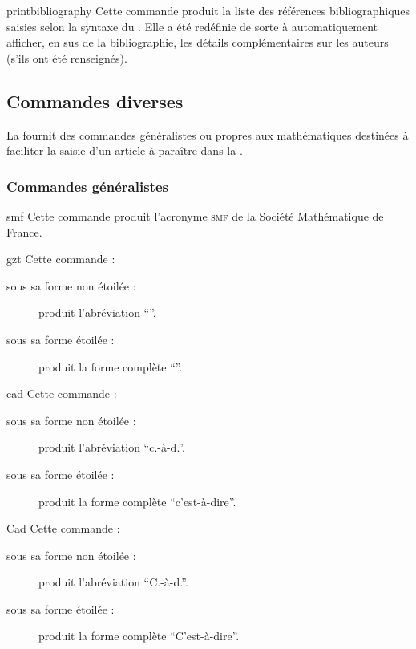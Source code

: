 \begin{docCommand}{printbibliography}{}
  Cette commande produit la liste des références bibliographiques saisies selon
  la syntaxe du . Elle a été redéfinie de sorte
  à automatiquement afficher, en sus de la bibliographie, les détails
  complémentaires sur les auteurs (s'ils ont été renseignés).
\end{docCommand}

\subsection{Commandes diverses}
\label{sec:commandes-diverses}

La \gztauthorcl{} fournit des commandes généralistes ou propres aux
mathématiques destinées à faciliter la saisie d'un article à paraître dans la
\gzt{}.

\subsubsection{Commandes généralistes}
\label{sec:comm-gener}

\begin{docCommand}{smf}{}
  Cette commande produit l'acronyme \textsc{smf} de la Société Mathématique de
  France.
\end{docCommand}

\begin{docCommand}{gzt}{}
  Cette commande :
  \begin{description}
  \item[sous sa forme non étoilée :] produit l'abréviation \enquote{\gzt}.
  \item[sous sa forme étoilée :] produit la forme complète \enquote{\gzt*}.
  \end{description}
\end{docCommand}

\begin{docCommand}{cad}{}
  Cette commande :
  \begin{description}
  \item[sous sa forme non étoilée :] produit l'abréviation \enquote{c.-à-d.}.
  \item[sous sa forme étoilée :] produit la forme complète
    \enquote{c'est-à-dire}.
  \end{description}
\end{docCommand}

\begin{docCommand}{Cad}{}
  Cette commande :
  \begin{description}
  \item[sous sa forme non étoilée :] produit l'abréviation \enquote{C.-à-d.}.
  \item[sous sa forme étoilée :] produit la forme complète
    \enquote{C'est-à-dire}.
  \end{description}
\end{docCommand}


